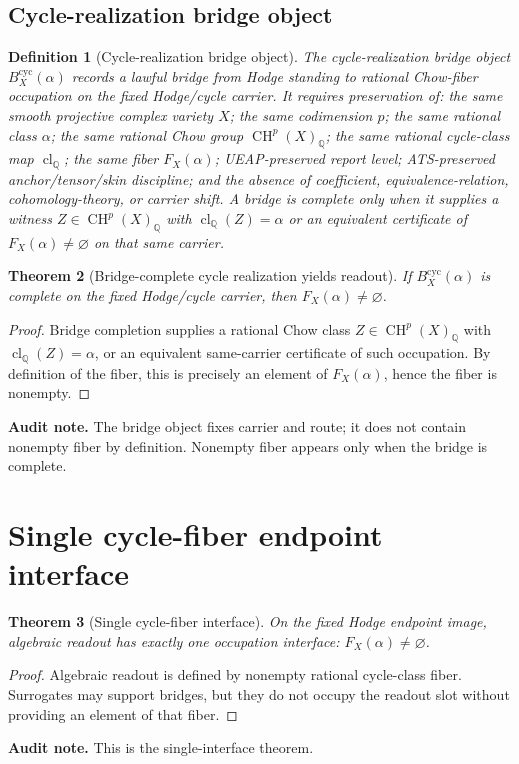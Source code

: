 \documentclass[11pt]{article}
\newtheorem{theorem}{Theorem}[section]
\newtheorem{definition}[theorem]{Definition}
\newcommand{\QQ}{\mathbb{Q}}
\newcommand{\CH}{\operatorname{CH}}
\newcommand{\clQ}{\operatorname{cl}_{\QQ}}
\begin{document}
\subsection{Cycle-realization bridge object}

\begin{definition}[Cycle-realization bridge object]
The cycle-realization bridge object $B^{\mathrm{cyc}}_X(\alpha)$ records a lawful bridge from Hodge standing to rational Chow-fiber occupation on the fixed Hodge/cycle carrier.  It requires preservation of: the same smooth projective complex variety $X$; the same codimension $p$; the same rational class $\alpha$; the same rational Chow group $\CH^p(X)_\QQ$; the same rational cycle-class map $\clQ$; the same fiber $F_X(\alpha)$; UEAP-preserved report level; ATS-preserved anchor/tensor/skin discipline; and the absence of coefficient, equivalence-relation, cohomology-theory, or carrier shift.  A bridge is complete only when it supplies a witness $Z\in\CH^p(X)_\QQ$ with $\clQ(Z)=\alpha$ or an equivalent certificate of $F_X(\alpha)\neq\varnothing$ on that same carrier.
\end{definition}

\begin{theorem}[Bridge-complete cycle realization yields readout]
If $B^{\mathrm{cyc}}_X(\alpha)$ is complete on the fixed Hodge/cycle carrier, then $F_X(\alpha)\neq\varnothing$.
\end{theorem}
\begin{proof}
Bridge completion supplies a rational Chow class $Z\in\CH^p(X)_\QQ$ with $\clQ(Z)=\alpha$, or an equivalent same-carrier certificate of such occupation.  By definition of the fiber, this is precisely an element of $F_X(\alpha)$, hence the fiber is nonempty.
\end{proof}
\par\noindent\textbf{Audit note.} The bridge object fixes carrier and route; it does not contain nonempty fiber by definition.  Nonempty fiber appears only when the bridge is complete.

\section{Single cycle-fiber endpoint interface}


\begin{theorem}[Single cycle-fiber interface]
On the fixed Hodge endpoint image, algebraic readout has exactly one occupation interface: $F_X(\alpha)\neq\varnothing$.
\end{theorem}
\begin{proof}
Algebraic readout is defined by nonempty rational cycle-class fiber. Surrogates may support bridges, but they do not occupy the readout slot without providing an element of that fiber.
\end{proof}
\par\noindent\textbf{Audit note.} This is the single-interface theorem.
\end{document}
